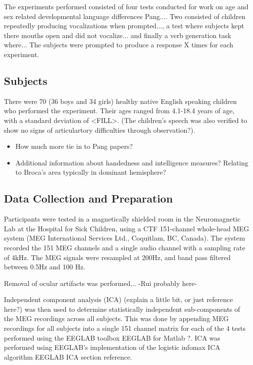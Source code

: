 \documentclass[a4paper]{article}
\begin{document}
The experiments performed consisted of four tests conducted for work on age and sex related developmental language differences {Pang...}. Two consisted of children repeatedly producing vocalizations when prompted..., a test where subjects kept there mouths open and did not vocalize... and finally a verb generation task where... The subjects were prompted to produce a response X times for each experiment.

\subsection{Subjects}

There were 70 (36 boys and 34 girls) healthy native English speaking children who performed the experiment. Their ages ranged from 4.1-18.4 years of age, with a standard deviation of <FILL>. (The children's speech was also verified to show no signs of articulartory difficulties through observation?).

\begin{itemize}
\item How much more tie in to Pang papers?
\item Additional information about handedness and intelligence measures? Relating to Broca's area typically in dominant hemisphere?
\end{itemize}

\subsection{Data Collection and Preparation}

Participants were tested in a magnetically shielded room in the Neuromagnetic Lab at the Hospital for Sick Children, using a CTF 151-channel whole-head MEG system (MEG International Services Ltd., Coquitlam, BC, Canada). The system recorded the 151 MEG channels and a single audio channel with a sampling rate of 4kHz. The MEG signals were resampled at 200Hz, and band pass filtered between 0.5Hz and 100 Hz.

Removal of ocular artifacts was performed... -Rui probably here-

Independent component analysis (ICA) (explain a little bit, or just reference here?) was then used to determine statistically independent sub-components of the MEG recordings across all subjects. This was done by appending MEG recordings for all subjects into a single 151 channel matrix for each of the 4 tests performed using the EEGLAB toolbox {EEGLAB} for Matlab {?}. ICA was performed using EEGLAB's implementation of the logistic infomax ICA algorithm {EEGLAB ICA section reference}.
\end{document}
